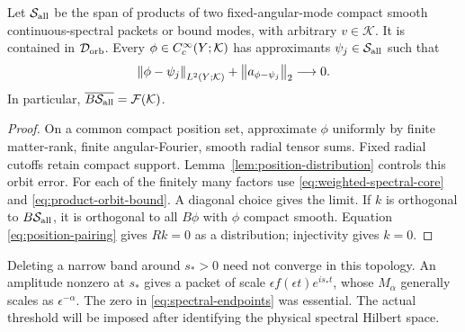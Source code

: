 \begin{theorem}
Let $\mathcal S_{\mathrm{all}}$ be the span of products of two fixed-angular-mode
compact smooth continuous-spectral packets or bound modes, with arbitrary
$v\in\mathcal K$. It is contained in $\mathcal D_{\mathrm{orb}}$. Every
$\phi\in C_c^\infty(Y;\mathcal K)$ has approximants $\psi_j\in\mathcal S_{\mathrm{all}}$
such that
\begin{equation}
 \left\lVert\phi-\psi_j\right\rVert_{L^2(Y;\mathcal K)}+
 \left\lVert a_{\phi-\psi_j}\right\rVert_2\longrightarrow0.
\end{equation}
In particular, $\overline{B\mathcal S_{\mathrm{all}}}=\mathcal F(\mathcal K)$.
\label{thm:ambient-core}
\end{theorem}
\begin{proof}
On a common compact position set, approximate $\phi$ uniformly by finite
matter-rank, finite angular-Fourier, smooth radial tensor sums. Fixed radial
cutoffs retain compact support. Lemma~\ref{lem:position-distribution}
controls this orbit error. For each of the finitely many factors use
\eqref{eq:weighted-spectral-core} and \eqref{eq:product-orbit-bound}.
A diagonal choice gives the limit. If $k$ is orthogonal to
$B\mathcal S_{\mathrm{all}}$, it is orthogonal to all $B\phi$ with $\phi$ compact
smooth. Equation \eqref{eq:position-pairing} gives $Rk=0$ as a
distribution; injectivity gives $k=0$.
\end{proof}

\begin{remark}
Deleting a narrow band around $s_*>0$ need not converge in this topology.
An amplitude nonzero at $s_*$ gives a packet of scale
$\epsilon f(\epsilon t)e^{is_*t}$, whose $M_\alpha$ generally scales as
$\epsilon^{-\alpha}$. The zero in \eqref{eq:spectral-endpoints} was
essential. The actual threshold will be imposed after identifying the
physical spectral Hilbert space.
\end{remark}
